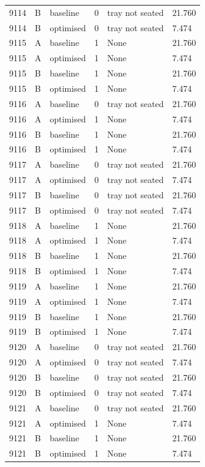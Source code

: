 \begin{longtable}{llllll}
9114 & B & baseline & 0 & tray not seated & 21.760 \\
9114 & B & optimised & 0 & tray not seated & 7.474 \\
9115 & A & baseline & 1 & None & 21.760 \\
9115 & A & optimised & 1 & None & 7.474 \\
9115 & B & baseline & 1 & None & 21.760 \\
9115 & B & optimised & 1 & None & 7.474 \\
9116 & A & baseline & 0 & tray not seated & 21.760 \\
9116 & A & optimised & 1 & None & 7.474 \\
9116 & B & baseline & 1 & None & 21.760 \\
9116 & B & optimised & 1 & None & 7.474 \\
9117 & A & baseline & 0 & tray not seated & 21.760 \\
9117 & A & optimised & 0 & tray not seated & 7.474 \\
9117 & B & baseline & 0 & tray not seated & 21.760 \\
9117 & B & optimised & 0 & tray not seated & 7.474 \\
9118 & A & baseline & 1 & None & 21.760 \\
9118 & A & optimised & 1 & None & 7.474 \\
9118 & B & baseline & 1 & None & 21.760 \\
9118 & B & optimised & 1 & None & 7.474 \\
9119 & A & baseline & 1 & None & 21.760 \\
9119 & A & optimised & 1 & None & 7.474 \\
9119 & B & baseline & 1 & None & 21.760 \\
9119 & B & optimised & 1 & None & 7.474 \\
9120 & A & baseline & 0 & tray not seated & 21.760 \\
9120 & A & optimised & 0 & tray not seated & 7.474 \\
9120 & B & baseline & 0 & tray not seated & 21.760 \\
9120 & B & optimised & 0 & tray not seated & 7.474 \\
9121 & A & baseline & 0 & tray not seated & 21.760 \\
9121 & A & optimised & 1 & None & 7.474 \\
9121 & B & baseline & 1 & None & 21.760 \\
9121 & B & optimised & 1 & None & 7.474 \\

\end{longtable}
